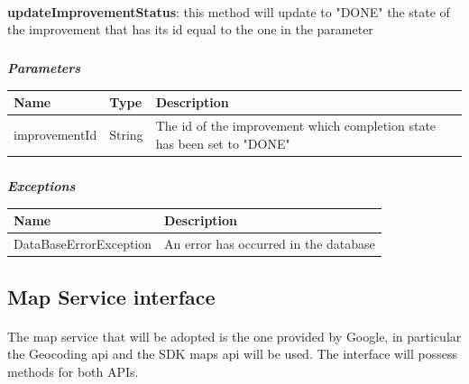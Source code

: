 						\paragraph{}
							\textbf{updateImprovementStatus}: this method will update to "DONE" the state of the improvement that has its id equal to the one in the parameter
							\subparagraph{}
							\textit{\textbf{Parameters}}
								\begin{table}[!h]
									\begin{tabular}{L{0.2\textwidth}L{0.2\textwidth}L{0.2\textwidth}}
										\toprule
										Name & Type & Description \\
										\midrule
								  		improvementId & String & The id of the improvement which completion state has been set to "DONE" \\
								 		\bottomrule
									\end{tabular}
								\end{table}
							\subparagraph{}
								\textit{\textbf{Exceptions}}
									\begin{table}[!h]
									\begin{tabular}{L{0.3\textwidth}L{0.3\textwidth}}
										\toprule
										Name & Description \\
										\midrule
								  		DataBaseErrorException & An error has occurred in the database \\ 
								 		\bottomrule
									\end{tabular}
								\end{table}
								
			\subsection{Map Service interface}
				\paragraph{}
					The map service that will be adopted is the one provided by Google, in particular the Geocoding api and the SDK maps api will be used. The interface will possess methods for both APIs.
					
